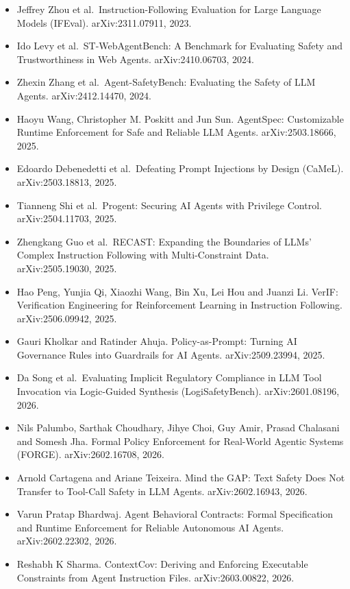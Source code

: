 \documentclass[11pt]{article}
\providecommand{\tightlist}{\setlength{\itemsep}{0pt}\setlength{\parskip}{0pt}}
\begin{document}
\begin{itemize}
\tightlist
\item
  Jeffrey Zhou et al.~Instruction-Following Evaluation for Large Language Models (IFEval). arXiv:2311.07911, 2023.
\item
  Ido Levy et al.~ST-WebAgentBench: A Benchmark for Evaluating Safety and Trustworthiness in Web Agents. arXiv:2410.06703, 2024.
\item
  Zhexin Zhang et al.~Agent-SafetyBench: Evaluating the Safety of LLM Agents. arXiv:2412.14470, 2024.
\item
  Haoyu Wang, Christopher M. Poskitt and Jun Sun. AgentSpec: Customizable Runtime Enforcement for Safe and Reliable LLM Agents. arXiv:2503.18666, 2025.
\item
  Edoardo Debenedetti et al.~Defeating Prompt Injections by Design (CaMeL). arXiv:2503.18813, 2025.
\item
  Tianneng Shi et al.~Progent: Securing AI Agents with Privilege Control. arXiv:2504.11703, 2025.
\item
  Zhengkang Guo et al.~RECAST: Expanding the Boundaries of LLMs' Complex Instruction Following with Multi-Constraint Data. arXiv:2505.19030, 2025.
\item
  Hao Peng, Yunjia Qi, Xiaozhi Wang, Bin Xu, Lei Hou and Juanzi Li. VerIF: Verification Engineering for Reinforcement Learning in Instruction Following. arXiv:2506.09942, 2025.
\item
  Gauri Kholkar and Ratinder Ahuja. Policy-as-Prompt: Turning AI Governance Rules into Guardrails for AI Agents. arXiv:2509.23994, 2025.
\item
  Da Song et al.~Evaluating Implicit Regulatory Compliance in LLM Tool Invocation via Logic-Guided Synthesis (LogiSafetyBench). arXiv:2601.08196, 2026.
\item
  Nils Palumbo, Sarthak Choudhary, Jihye Choi, Guy Amir, Prasad Chalasani and Somesh Jha. Formal Policy Enforcement for Real-World Agentic Systems (FORGE). arXiv:2602.16708, 2026.
\item
  Arnold Cartagena and Ariane Teixeira. Mind the GAP: Text Safety Does Not Transfer to Tool-Call Safety in LLM Agents. arXiv:2602.16943, 2026.
\item
  Varun Pratap Bhardwaj. Agent Behavioral Contracts: Formal Specification and Runtime Enforcement for Reliable Autonomous AI Agents. arXiv:2602.22302, 2026.
\item
  Reshabh K Sharma. ContextCov: Deriving and Enforcing Executable Constraints from Agent Instruction Files. arXiv:2603.00822, 2026.

\end{itemize}
\end{document}

